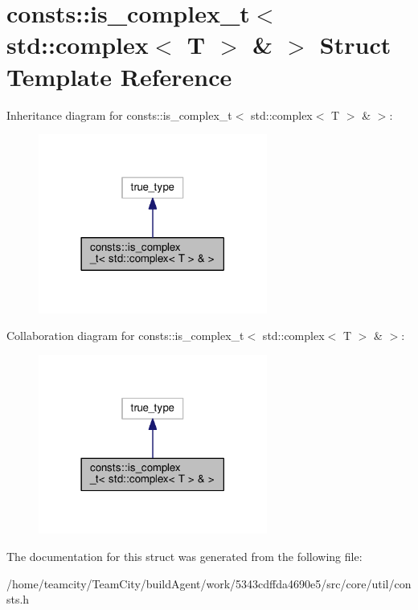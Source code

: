 \hypertarget{structconsts_1_1is__complex__t_3_01std_1_1complex_3_01T_01_4_01_6_01_4}{}\section{consts\+:\+:is\+\_\+complex\+\_\+t$<$ std\+:\+:complex$<$ T $>$ \& $>$ Struct Template Reference}
\label{structconsts_1_1is__complex__t_3_01std_1_1complex_3_01T_01_4_01_6_01_4}


Inheritance diagram for consts\+:\+:is\+\_\+complex\+\_\+t$<$ std\+:\+:complex$<$ T $>$ \& $>$\+:
\nopagebreak
\begin{figure}[H]
\begin{center}
\leavevmode
\includegraphics[width=213pt]{structconsts_1_1is__complex__t_3_01std_1_1complex_3_01T_01_4_01_6_01_4__inherit__graph}
\end{center}
\end{figure}


Collaboration diagram for consts\+:\+:is\+\_\+complex\+\_\+t$<$ std\+:\+:complex$<$ T $>$ \& $>$\+:
\nopagebreak
\begin{figure}[H]
\begin{center}
\leavevmode
\includegraphics[width=213pt]{structconsts_1_1is__complex__t_3_01std_1_1complex_3_01T_01_4_01_6_01_4__coll__graph}
\end{center}
\end{figure}


The documentation for this struct was generated from the following file\+:\begin{DoxyCompactItemize}
\item 
/home/teamcity/\+Team\+City/build\+Agent/work/5343cdffda4690e5/src/core/util/consts.\+h\end{DoxyCompactItemize}
